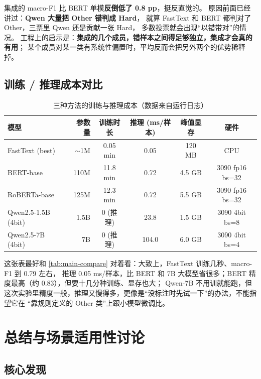 \documentclass{SYSUReport}
\begin{document}
集成的 macro-F1 比 BERT 单模\textbf{反倒低了 0.8 pp}，挺反直觉的。
原因前面已经讲过：\textbf{Qwen 大量把 Other 错判成 Hard}，
就算 FastText 和 BERT 都判对了 Other，三票里 Qwen 还是贡献一张 Hard，
多数投票就会出现“以错带对”的情况。
工程上的启示是：\textbf{集成的几个成员，错样本之间得足够独立，集成才会真的有用}；
某个成员对某一类有系统性偏置时，平均反而会把另外两个的优势稀释掉。

\subsection{训练 / 推理成本对比}\label{sec:cost}

\begin{table}[!htbp]
\centering
\caption{三种方法的训练与推理成本（数据来自运行日志）}
\label{tab:cost}
\small
\setlength{\tabcolsep}{5pt}
\begin{tabular}{lrcccc}
\toprule
模型 & 参数量 & 训练时长 & 推理 (ms/样本) & 峰值显存 & 硬件 \\
\midrule
FastText (best)        & $\sim$1M  & 0.05 min     & 0.05  & 120 MB  & CPU \\
BERT-base              & 110M      & 11.8 min     & 0.72  & 4.5 GB & 3090 fp16 bs=32 \\
RoBERTa-base           & 125M      & 12.3 min     & 0.72  & 5.5 GB & 3090 fp16 bs=32 \\
Qwen2.5-1.5B (4bit)    & 1.5B      & 0 (推理)     & 23.8  & 1.5 GB & 3090 4bit bs=8 \\
Qwen2.5-7B (4bit)      & 7B        & 0 (推理)     & 104.0 & 6.0 GB & 3090 4bit bs=4 \\
\bottomrule
\end{tabular}
\end{table}

这张表最好和 \autoref{tab:main-compare} 对着看：大致上，FastText 训练几秒、macro-F1 到 0.79 左右，
推理 0.05 ms/样本，比 BERT 和 7B 大模型省很多；BERT 精度最高（约 0.83），但要十几分种训练、显存也大；
Qwen-7B 不用训就能跑，但这次实验里精度一般，推理又慢得多，更像是“没标注时先试一下”的办法，不能指望它在
“靠规则定义的 Other 类”上跟小模型微调比。

\section{总结与场景适用性讨论}

\subsection{核心发现}
\end{document}
